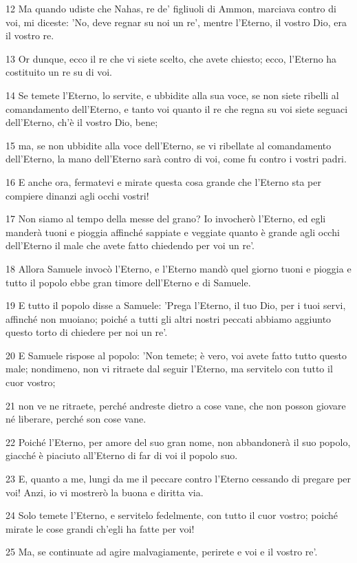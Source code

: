 \par 12 Ma quando udiste che Nahas, re de' figliuoli di Ammon, marciava contro di voi, mi diceste: 'No, deve regnar su noi un re', mentre l'Eterno, il vostro Dio, era il vostro re.
\par 13 Or dunque, ecco il re che vi siete scelto, che avete chiesto; ecco, l'Eterno ha costituito un re su di voi.
\par 14 Se temete l'Eterno, lo servite, e ubbidite alla sua voce, se non siete ribelli al comandamento dell'Eterno, e tanto voi quanto il re che regna su voi siete seguaci dell'Eterno, ch'è il vostro Dio, bene;
\par 15 ma, se non ubbidite alla voce dell'Eterno, se vi ribellate al comandamento dell'Eterno, la mano dell'Eterno sarà contro di voi, come fu contro i vostri padri.
\par 16 E anche ora, fermatevi e mirate questa cosa grande che l'Eterno sta per compiere dinanzi agli occhi vostri!
\par 17 Non siamo al tempo della messe del grano? Io invocherò l'Eterno, ed egli manderà tuoni e pioggia affinché sappiate e veggiate quanto è grande agli occhi dell'Eterno il male che avete fatto chiedendo per voi un re'.
\par 18 Allora Samuele invocò l'Eterno, e l'Eterno mandò quel giorno tuoni e pioggia e tutto il popolo ebbe gran timore dell'Eterno e di Samuele.
\par 19 E tutto il popolo disse a Samuele: 'Prega l'Eterno, il tuo Dio, per i tuoi servi, affinché non muoiano; poiché a tutti gli altri nostri peccati abbiamo aggiunto questo torto di chiedere per noi un re'.
\par 20 E Samuele rispose al popolo: 'Non temete; è vero, voi avete fatto tutto questo male; nondimeno, non vi ritraete dal seguir l'Eterno, ma servitelo con tutto il cuor vostro;
\par 21 non ve ne ritraete, perché andreste dietro a cose vane, che non posson giovare né liberare, perché son cose vane.
\par 22 Poiché l'Eterno, per amore del suo gran nome, non abbandonerà il suo popolo, giacché è piaciuto all'Eterno di far di voi il popolo suo.
\par 23 E, quanto a me, lungi da me il peccare contro l'Eterno cessando di pregare per voi! Anzi, io vi mostrerò la buona e diritta via.
\par 24 Solo temete l'Eterno, e servitelo fedelmente, con tutto il cuor vostro; poiché mirate le cose grandi ch'egli ha fatte per voi!
\par 25 Ma, se continuate ad agire malvagiamente, perirete e voi e il vostro re'.

